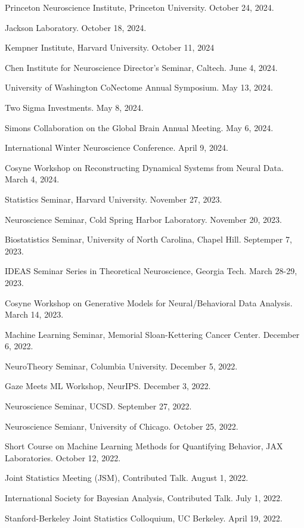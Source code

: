 \documentclass[10pt]{article}
\begin{document}
\begin{outerlist}
\item Princeton Neuroscience Institute, Princeton University. October 24, 2024.
\item Jackson Laboratory. October 18, 2024.
\item Kempner Institute, Harvard University. October 11, 2024
\item Chen Institute for Neuroscience Director's Seminar, Caltech. June 4, 2024.
\item University of Washington CoNectome Annual Symposium. May 13, 2024. 
\item Two Sigma Investments. May 8, 2024. 
\item Simons Collaboration on the Global Brain Annual Meeting. May 6, 2024. 
\item International Winter Neuroscience Conference. April 9, 2024. 
\item Cosyne Workshop on Reconstructing Dynamical Systems from Neural Data. March 4, 2024. 
\item Statistics Seminar, Harvard University. November 27, 2023. 
\item Neuroscience Seminar, Cold Spring Harbor Laboratory. November 20, 2023. 
\item Biostatistics Seminar, University of North Carolina, Chapel Hill. Septemper 7, 2023.
\item IDEAS Seminar Series in Theoretical Neuroscience, Georgia Tech. March 28-29, 2023.
\item Cosyne Workshop on Generative Models for Neural/Behavioral Data Analysis. March 14, 2023.
\item Machine Learning Seminar, Memorial Sloan-Kettering Cancer Center. December 6, 2022.
\item NeuroTheory Seminar, Columbia University. December 5, 2022.
\item Gaze Meets ML Workshop, NeurIPS. December 3, 2022.
\item Neuroscience Seminar, UCSD. September 27, 2022.
\item Neuroscience Semianr, University of Chicago. October 25, 2022.
\item Short Course on Machine Learning Methods for Quantifying Behavior, JAX Laboratories. October 12, 2022.
\item Joint Statistics Meeting (JSM), Contributed Talk. August 1, 2022.
\item International Society for Bayesian Analysis, Contributed Talk. July 1, 2022.
\item Stanford-Berkeley Joint Statistics Colloquium, UC Berkeley. April 19, 2022.

\end{outerlist}
\end{document}
